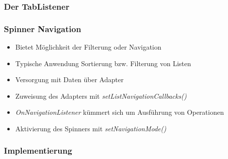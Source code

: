 \begin{frame}
   \frametitle{Der TabListener}
   
\end{frame}

\begin{frame}
   \frametitle{Spinner Navigation}
   \begin{itemize}
      \item Bietet Möglichkeit der Filterung oder Navigation 
      \item Typische Anwendung Sortierung bzw. Filterung von Listen
      \item Versorgung mit Daten über Adapter
      \item Zuweisung des Adapters mit \emph{setListNavigationCallbacks()} 
      \item \emph{OnNavigationListener} kümmert sich um Ausführung von Operationen
      \item Aktivierung des Spinners mit \emph{setNavigationMode()}
   \end{itemize}
\end{frame}

\begin{frame}
   \frametitle{Implementierung}
   
\end{frame}

